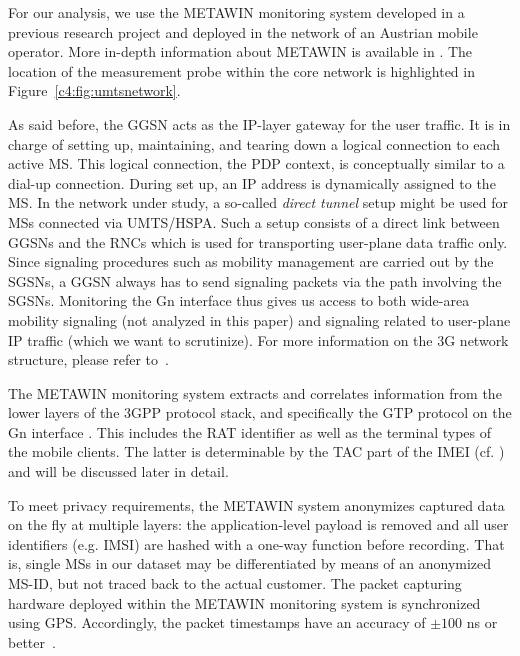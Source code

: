 For our analysis, we use the \ac{METAWIN} monitoring system developed in a previous research project
and deployed in the network of an Austrian mobile operator.  More in-depth information about \ac{METAWIN} is available in \cite{ricciato_2011}.
The location of the measurement probe within the core network is highlighted in Figure~\ref{c4:fig:umtsnetwork}. 

As said before, the \ac{GGSN} acts as the IP-layer gateway for the user traffic. It is in charge of setting up,
maintaining, and tearing down a logical connection to each active \ac{MS}. This logical connection, the \ac{PDP} context,
is conceptually similar to a dial-up connection. During set up, an
IP address is dynamically assigned to the \ac{MS}.
In the network under study, a so-called \textit{direct tunnel} setup might be used for \acp{MS} connected
via \ac{UMTS}/\ac{HSPA}. Such a setup consists of a direct link between \acp{GGSN} and the
\acp{RNC} %
which is used for
transporting user-plane data traffic only. Since signaling procedures such
as mobility management are carried out by the \acp{SGSN}, a \ac{GGSN} always has to send signaling packets
via the path involving the \acp{SGSN}. Monitoring the Gn interface thus gives us access to both wide-area mobility signaling (not analyzed in this paper) %
and signaling related to user-plane IP traffic (which we want to scrutinize).
For more information on the \ac{3G} network structure, please refer to~\cite{bannister_convergence_2004}.

The METAWIN monitoring system extracts and correlates information from the lower
layers of the \ac{3GPP} protocol stack, and specifically the \ac{GTP} protocol
on the Gn interface \cite{3gpp129.060}. This includes the \acf{RAT} identifier as well as the terminal types of the mobile clients. The
latter is determinable by the \acf{TAC} part of the \acf{IMEI} (cf. \cite{3gpp23.003}) and will be discussed later in detail.

To meet privacy requirements, the METAWIN system anonymizes captured data on the fly at multiple
layers: the application-level payload is removed and all user identifiers (e.g. \ac{IMSI}) are
hashed with a one-way function before recording. That is, single
\acp{MS} in our dataset may be differentiated by means of an anonymized \ac{MS-ID}, but not traced back to the actual customer.
The packet capturing hardware deployed within the METAWIN monitoring system is synchronized
using \ac{GPS}. Accordingly, the packet timestamps
have an accuracy of $\pm100$ ns or better~\cite[p.97-98]{donnelly_high_2002}.



